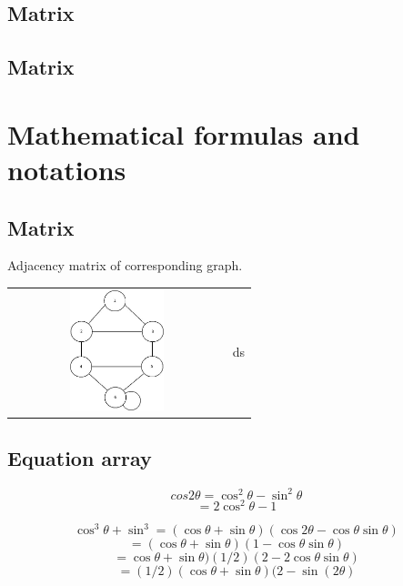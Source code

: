 \documentclass{article}
\begin{document}
\subsection{Matrix}
\subsection{Matrix}

\section{Mathematical formulas and notations} %
\subsection{Matrix}
Adjacency matrix of corresponding graph.


\begin{table}[H]
\centering
\begin{tabular} {l | l}

\includegraphics[width=6cm,height=3.5cm]{flow.jpeg}
   & 
ds

 \\

\end{tabular}
\end{table}



\subsection{Equation array}
\[cos 2\theta=\cos^2\theta-\sin^2\theta\]
\[=2\cos^2\theta-1\]


\[\cos^3\theta+\sin^3=(\cos\theta+\sin\theta)(\cos2\theta−\cos\theta\sin\theta)\]
\[=(\cos\theta+\sin\theta)(1−\cos\theta\sin\theta)\]
\[=\cos\theta+\sin\theta)(1/2)(2−2\cos\theta\sin\theta)\]
\[=(1/2)(\cos\theta+\sin\theta)(2−\sin(2\theta)\]
\\
\end{document}
